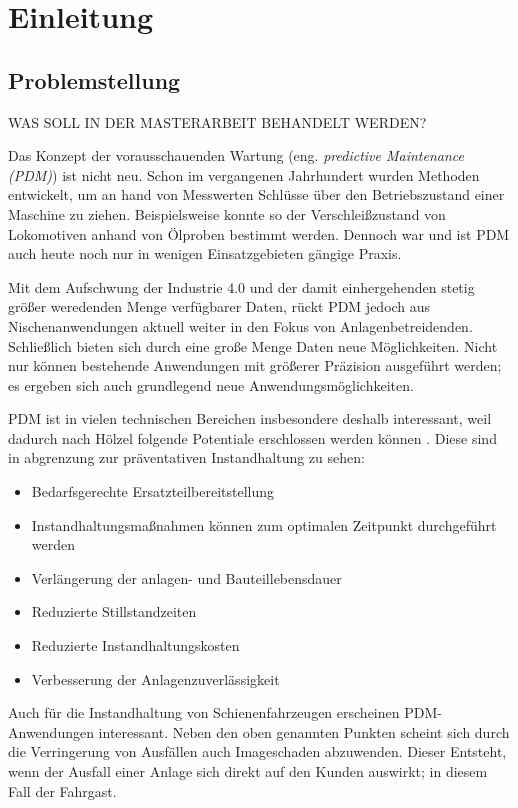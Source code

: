 \chapter{Einleitung}
\label{ch:einleitung}

\section{Problemstellung}
\label{sec:motivation}
WAS SOLL IN DER MASTERARBEIT BEHANDELT WERDEN?

Das Konzept der vorausschauenden Wartung (eng. \textit{predictive Maintenance (PDM)}) ist nicht neu. Schon im vergangenen Jahrhundert wurden Methoden entwickelt, um an hand von Messwerten Schlüsse über den Betriebszustand einer Maschine zu ziehen. Beispielsweise konnte so der Verschleißzustand von Lokomotiven anhand von Ölproben bestimmt werden.  Dennoch war und ist PDM auch heute noch nur in wenigen Einsatzgebieten gängige Praxis.

Mit dem Aufschwung der Industrie 4.0 und der damit einhergehenden stetig größer weredenden Menge verfügbarer Daten, rückt PDM jedoch aus Nischenanwendungen aktuell weiter in den Fokus von Anlagenbetreidenden. Schließlich bieten sich durch eine große Menge Daten neue Möglichkeiten. Nicht nur können bestehende Anwendungen mit größerer Präzision ausgeführt werden; es ergeben sich auch grundlegend neue Anwendungsmöglichkeiten. 

PDM ist in vielen technischen Bereichen insbesondere deshalb interessant, weil  dadurch nach Hölzel folgende Potentiale erschlossen werden können . Diese sind in abgrenzung zur präventativen Instandhaltung zu sehen:
\begin{itemize}
	\item Bedarfsgerechte Ersatzteilbereitstellung
	\item Instandhaltungsmaßnahmen können zum optimalen Zeitpunkt durchgeführt werden
	\item Verlängerung der anlagen- und Bauteillebensdauer
	\item Reduzierte Stillstandzeiten
	\item Reduzierte Instandhaltungskosten
	\item Verbesserung der Anlagenzuverlässigkeit
\end{itemize}

Auch für die Instandhaltung von Schienenfahrzeugen erscheinen PDM-Anwendungen interessant. Neben den oben genannten Punkten scheint sich durch die Verringerung von Ausfällen auch Imageschaden abzuwenden. Dieser Entsteht, wenn  der Ausfall einer Anlage sich direkt auf den Kunden auswirkt; in diesem Fall der Fahrgast.

